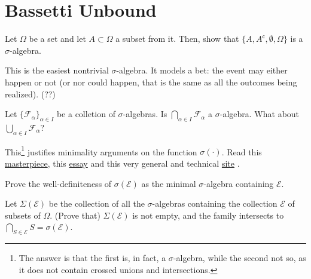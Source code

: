 
\chapter*{Bassetti Unbound}

\begin{my_ex}
	Let $\Omega$ be a set and let $A \subset \Omega$ a subset from it. Then, show that $\{ A, A^\mathsf{c}, \emptyset, \Omega \}$ is a $\sigma$-algebra.
\end{my_ex}
\begin{my_notes}
	This is the easiest nontrivial $\sigma$-algebra. It models a bet: the event may either happen or not (or nor could happen, that is the same as all the outcomes being realized). (??)
\end{my_notes}

\begin{my_ex}
	Let $\{ \mathcal{F}_\alpha \}_{\alpha \in I}$ be a colletion of $\sigma$-algebras. Is $\bigcap_{\alpha \in I} \mathcal{F}_\alpha$ a $\sigma$-algebra. What about $\bigcup_{\alpha \in I} \mathcal{F}_\alpha$?
\end{my_ex}
\begin{my_notes}
	This\footnote{The answer is that the first is, in fact, a $\sigma$-algebra, while the second not so, as it does not contain crossed unions and intersections.} justifies minimality arguments on the function $\sigma(\cdot)$. Read this \href{https://math.stackexchange.com/questions/54172/the-sigma-algebra-of-subsets-of-x-generated-by-a-set-mathcala-is-the-s/}{masterpiece}, this \href{https://groups.google.com/g/sci.math/c/DjVj6RiXOLs/m/PSMsTtfEnO8J}{essay} and this very general and technical \href{https://ncatlab.org/nlab/show/Moore+closure}{site} .
\end{my_notes}

\begin{my_ex}
	Prove the well-definiteness of $\sigma(\mathcal{E})$ as the minimal $\sigma$-algebra containing $\mathcal{E}$.
\end{my_ex}
\begin{my_notes}
	Let $\Sigma(\mathcal{E})$ be the collection of all the $\sigma$-algebras containing the collection $\mathcal{E}$ of subsets of $\Omega$. (Prove that) $\Sigma(\mathcal{E})$ is not empty, and the family intersects to $\bigcap_{S\in\mathcal{E}}S = \sigma(\mathcal{E})$.
\end{my_notes}

